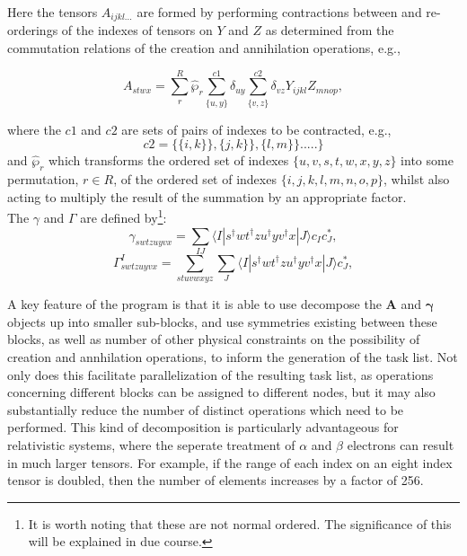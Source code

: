 \noindent Here the tensors $A_{ijkl...}$ are formed by performing 
contractions between and re-orderings of the indexes of tensors on $Y$ and $Z$ as 
determined from the commutation relations of the creation and annihilation operations, e.g.,
 
\begin{equation*}
A_{stwx} = \sum_{r}^{R}\hat{\wp}_{r}\sum^{c1}_{\{u,y\}}\delta_{uy}\sum^{c2}_{\{v,z\}} \delta_{vz}Y_{ijkl}Z_{mnop},
\end{equation*}

\noindent where the $c1$ and $c2$ are sets of pairs of indexes to be contracted, e.g.,
\begin{equation}
c2 = \{ \{i, k\} \} , \{j, k\} \} ,\{l, m\} \}.....\} 
\end{equation}
and $\hat{\wp}_{r}$ which transforms the ordered set of indexes
$\{u,v,s,t,w,x,y,z\}$ into some permutation, $r\in R$, of the ordered set of
indexes $\{i,j,k,l,m,n,o,p\}$, whilst also acting to multiply the result of the
summation by an appropriate factor.\\

\noindent The $\gamma$ and $\Gamma$ are defined by\footnote{It is worth noting that these are not normal ordered. The significance
of this will be explained in due course.}:
\begin{equation}
\gamma_{swtzuyvx} = \sum_{IJ} \langle I | s^{\dagger}wt^{\dagger}zu^{\dagger}yv^{\dagger}x | J \rangle c_{I} c^{*}_{J},
\end{equation}
\begin{equation}
\Gamma_{swtzuyvx}^{I} = 
\sum_{stuvwxyz} \sum_{J} \langle I | s^{\dagger}wt^{\dagger}zu^{\dagger}yv^{\dagger}x | J \rangle c^{*}_{J},
\end{equation}

\noindent A key feature of the program is that it is able to use decompose the $\mathbf{A}$ and $\mathbf{\gamma}$ objects
up into smaller sub-blocks, and use symmetries existing between these blocks, as well as number of other physical constraints
on the possibility of creation and annhilation operations, to inform the generation of the task list. Not only does this 
facilitate parallelization of the resulting task list, as operations concerning different blocks can be assigned to 
different nodes, but it may also substantially reduce the number of distinct operations which need to be performed. 
This kind of decomposition is particularly advantageous for relativistic systems, where the seperate treatment of
$\alpha$ and $\beta$ electrons can result in much larger tensors. For example, if the range of each index on
an eight index tensor is doubled, then the number of elements increases by a factor of 256.\\ 

